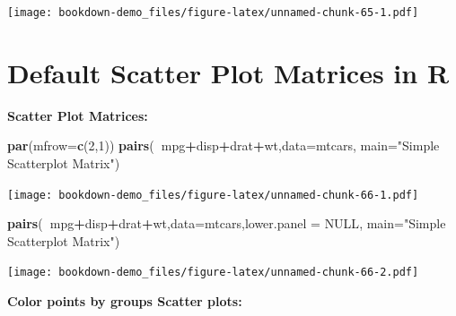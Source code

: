 \documentclass[]{book}
\newenvironment{Shaded}{\begin{snugshade}}{\end{snugshade}}
\newcommand{\KeywordTok}[1]{\textcolor[rgb]{0.13,0.29,0.53}{\textbf{#1}}}
\newcommand{\DataTypeTok}[1]{\textcolor[rgb]{0.13,0.29,0.53}{#1}}
\newcommand{\DecValTok}[1]{\textcolor[rgb]{0.00,0.00,0.81}{#1}}
\newcommand{\FloatTok}[1]{\textcolor[rgb]{0.00,0.00,0.81}{#1}}
\newcommand{\StringTok}[1]{\textcolor[rgb]{0.31,0.60,0.02}{#1}}
\newcommand{\OtherTok}[1]{\textcolor[rgb]{0.56,0.35,0.01}{#1}}
\newcommand{\OperatorTok}[1]{\textcolor[rgb]{0.81,0.36,0.00}{\textbf{#1}}}
\newcommand{\NormalTok}[1]{#1}
\begin{document}
\texttt{[image: bookdown-demo\_files/figure-latex/unnamed-chunk-65-1.pdf]}

\chapter{Default Scatter Plot Matrices in
R}\label{default-scatter-plot-matrices-in-r}

\textbf{Scatter Plot Matrices:}

\begin{Shaded}
\begin{Highlighting}[]
\KeywordTok{par}\NormalTok{(}\DataTypeTok{mfrow=}\KeywordTok{c}\NormalTok{(}\DecValTok{2}\NormalTok{,}\DecValTok{1}\NormalTok{))}
\KeywordTok{pairs}\NormalTok{(}\OperatorTok{~}\NormalTok{mpg}\OperatorTok{+}\NormalTok{disp}\OperatorTok{+}\NormalTok{drat}\OperatorTok{+}\NormalTok{wt,}\DataTypeTok{data=}\NormalTok{mtcars, }
   \DataTypeTok{main=}\StringTok{"Simple Scatterplot Matrix"}\NormalTok{)}
\end{Highlighting}
\end{Shaded}

\texttt{[image: bookdown-demo\_files/figure-latex/unnamed-chunk-66-1.pdf]}

\begin{Shaded}
\begin{Highlighting}[]
\KeywordTok{pairs}\NormalTok{(}\OperatorTok{~}\NormalTok{mpg}\OperatorTok{+}\NormalTok{disp}\OperatorTok{+}\NormalTok{drat}\OperatorTok{+}\NormalTok{wt,}\DataTypeTok{data=}\NormalTok{mtcars,}\DataTypeTok{lower.panel =} \OtherTok{NULL}\NormalTok{,}
   \DataTypeTok{main=}\StringTok{"Simple Scatterplot Matrix"}\NormalTok{)}
\end{Highlighting}
\end{Shaded}

\texttt{[image: bookdown-demo\_files/figure-latex/unnamed-chunk-66-2.pdf]}

\textbf{Color points by groups Scatter plots:}

\begin{Shaded}
\end{Shaded}
\end{document}
